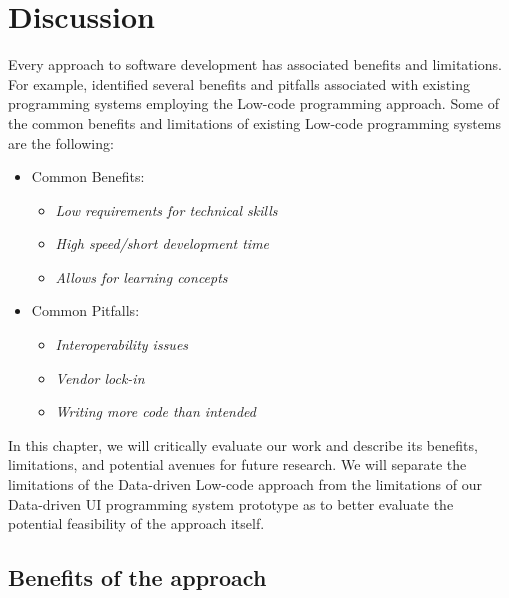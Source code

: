 \chapter{Discussion}
\label{chap:discussion}

Every approach to software development has associated benefits and limitations.
For example, \citet{Pinho_Aguiar_Amaral_2023} identified several benefits and pitfalls associated with existing programming systems employing the Low-code programming approach.
Some of the common benefits and limitations of existing Low-code programming systems are the following:
\begin{itemize}
	\item Common Benefits:
	      \begin{itemize}
		      \item \emph{Low requirements for technical skills}
		      \item \emph{High speed/short development time}
		      \item \emph{Allows for learning concepts}
	      \end{itemize}

	\item Common Pitfalls:
	      \begin{itemize}
		      \item \emph{Interoperability issues}
		      \item \emph{Vendor lock-in}
		      \item \emph{Writing more code than intended}
	      \end{itemize}
\end{itemize}


In this chapter, we will critically evaluate our work and describe its benefits, limitations, and potential avenues for future research.
We will separate the limitations of the Data-driven Low-code approach from the limitations of our Data-driven UI programming system prototype as to
better evaluate the potential feasibility of the approach itself.

\section{Benefits of the approach}

